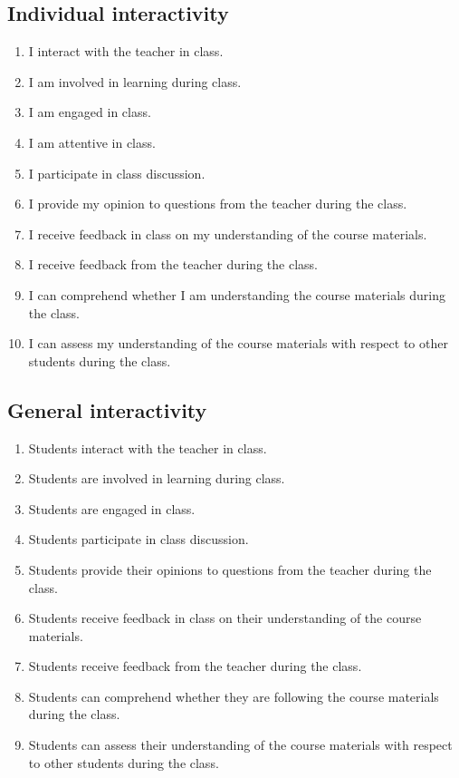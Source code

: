 \subsection{Individual interactivity}
\begin{enumerate}
    \item I interact with the teacher in class.
    \item I am involved in learning during class.
    \item I am engaged in class.
    \item I am attentive in class.
    \item I participate in class discussion.
    \item I provide my opinion to questions from the teacher during the class.
    \item I receive feedback in class on my understanding of the course materials.
    \item I receive feedback from the teacher during the class.
    \item I can comprehend whether I am understanding the course materials during the class.
    \item I can assess my understanding of the course materials with respect to other students during the class.
\end{enumerate}

\subsection{General interactivity}\label{app:pretest-general}
\begin{enumerate}
    \item Students interact with the teacher in class.
    \item Students are involved in learning during class.
    \item Students are engaged in class.
    \item Students participate in class discussion.
    \item Students provide their opinions to questions from the teacher during the class.
    \item Students receive feedback in class on their understanding of the course materials.
    \item Students receive feedback from the teacher during the class.
    \item Students can comprehend whether they are following the course materials during the class.
    \item Students can assess their understanding of the course materials with respect to other students during the class.
\end{enumerate}